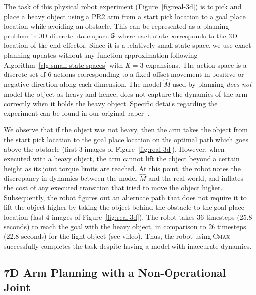 The task of this physical robot experiment (Figure~\ref{fig:real-3d}) is to pick and place a heavy 
object using a PR2 arm from a start pick location to a goal place
location while avoiding an obstacle. This can be represented as a
planning problem in 3D discrete state space $\mathbb{S}$ where
each state corresponds to the 3D location of the end-effector.
Since it is a
relatively small state space, we use exact planning updates without
any function approximation following
Algorithm~\ref{alg:small-state-spaces} with $K=3$ expansions.
The action space is a
discrete set of $6$ actions corresponding to a fixed offset movement
in positive or negative direction along each dimension.
The
model $\hat{M}$ used by planning \textit{does not} model the object as
heavy and hence, does not capture the dynamics of the arm correctly when it
holds the heavy object. Specific details regarding the experiment can
be found in our original paper~\cite{cmax}.

We observe that if the object was not heavy, then the arm takes the
object from the start pick location to the goal place location on the
optimal path which goes above the obstacle (first 3 images of
Figure~\ref{fig:real-3d}). However, when executed
with a heavy object, the arm cannot lift the object beyond a certain
height as its joint torque limits are reached. At this point, the robot notes the
discrepancy in dynamics between the model $\hat{M}$ and the real world,
and inflates the cost of any executed transition that tried to move the object
higher. Subsequently, the robot figures out
an alternate path that does not require it to lift the object higher
by taking the object behind the obstacle to the goal place
location (last 4 images of Figure~\ref{fig:real-3d}). The robot takes
36 timesteps (25.8 seconds) to reach
the goal with the heavy object, in comparison to 26 timesteps (22.8 seconds) for the
light object (see video). Thus, the robot using \textsc{Cmax} successfully completes the task despite having a
model with inaccurate dynamics.

\subsection{7D Arm Planning with a Non-Operational Joint}
\label{sec:real-world-7d}

